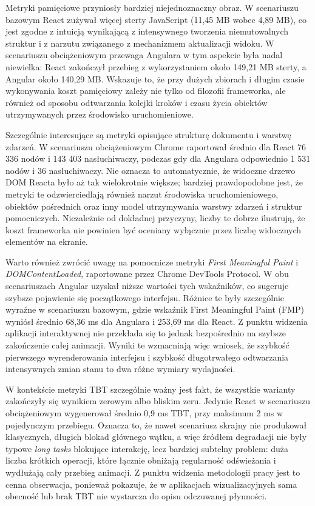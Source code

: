 \documentclass[12pt,openright,twoside]{report}
\begin{document}
Metryki pamięciowe przyniosły bardziej niejednoznaczny obraz. W scenariuszu bazowym React zużywał więcej sterty JavaScript (11,45 MB wobec 4,89 MB), co jest zgodne z intuicją wynikającą z intensywnego tworzenia niemutowalnych struktur i z narzutu związanego z mechanizmem aktualizacji widoku. W scenariuszu obciążeniowym przewaga Angulara w tym aspekcie była nadal niewielka: React zakończył przebieg z wykorzystaniem około 149,21 MB sterty, a Angular około 140,29 MB. Wskazuje to, że przy dużych zbiorach i długim czasie wykonywania koszt pamięciowy zależy nie tylko od filozofii frameworka, ale również od sposobu odtwarzania kolejki kroków i czasu życia obiektów utrzymywanych przez środowisko uruchomieniowe.

Szczególnie interesujące są metryki opisujące strukturę dokumentu i warstwę zdarzeń. W scenariuszu obciążeniowym Chrome raportował średnio dla React 76 336 nodów i 143 403 nasłuchiwaczy, podczas gdy dla Angulara odpowiednio 1 531 nodów i 36 nasłuchiwaczy. Nie oznacza to automatycznie, że widoczne drzewo DOM Reacta było aż tak wielokrotnie większe; bardziej prawdopodobne jest, że metryki te odzwierciedlają również narzut środowiska uruchomieniowego, obiektów pośrednich oraz inny model utrzymywania warstwy zdarzeń i struktur pomocniczych. Niezależnie od dokładnej przyczyny, liczby te dobrze ilustrują, że koszt frameworka nie powinien być oceniany wyłącznie przez liczbę widocznych elementów na ekranie.

Warto również zwrócić uwagę na pomocnicze metryki \textit{First Meaningful Paint} i \textit{DOMContentLoaded}, raportowane przez Chrome DevTools Protocol. W obu scenariuszach Angular uzyskał niższe wartości tych wskaźników, co sugeruje szybsze pojawienie się początkowego interfejsu. Różnice te były szczególnie wyraźne w scenariuszu bazowym, gdzie wskaźnik First Meaningful Paint (FMP) wyniósł średnio 68,36 ms dla Angulara i 253,69 ms dla React. Z punktu widzenia aplikacji interaktywnej nie przekłada się to jednak bezpośrednio na szybsze zakończenie całej animacji. Wyniki te wzmacniają więc wniosek, że szybkość pierwszego wyrenderowania interfejsu i szybkość długotrwałego odtwarzania intensywnych zmian stanu to dwa różne wymiary wydajności.

W kontekście metryki TBT szczególnie ważny jest fakt, że wszystkie warianty zakończyły się wynikiem zerowym albo bliskim zeru. Jedynie React w scenariuszu obciążeniowym wygenerował średnio 0,9 ms TBT, przy maksimum 2 ms w pojedynczym przebiegu. Oznacza to, że nawet scenariusz skrajny nie produkował klasycznych, długich blokad głównego wątku, a więc źródłem degradacji nie były typowe \textit{long tasks} blokujące interakcję, lecz bardziej subtelny problem: duża liczba krótkich operacji, które łącznie obniżają regularność odświeżania i wydłużają cały przebieg animacji. Z punktu widzenia metodologii pracy jest to cenna obserwacja, ponieważ pokazuje, że w aplikacjach wizualizacyjnych sama obecność lub brak TBT nie wystarcza do opisu odczuwanej płynności.
\end{document}
